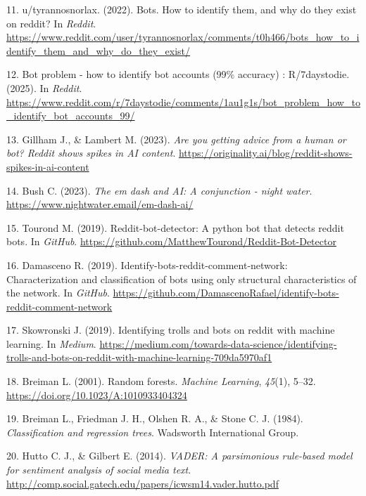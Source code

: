 \documentclass[
  12pt,
  letterpaper,
  DIV=11,
  numbers=noendperiod]{scrartcl}
\newlength{\cslhangindent}
\newenvironment{CSLReferences}[2] %
 {\begin{list}{}{%
  \setlength{\itemindent}{0pt}
  \setlength{\leftmargin}{0pt}
  \setlength{\parsep}{0pt}
  \ifodd #1
   \setlength{\leftmargin}{\cslhangindent}
   \setlength{\itemindent}{-1\cslhangindent}
  \fi
  \setlength{\itemsep}{#2\baselineskip}}}
 {\end{list}}
\begin{document}
\begin{CSLReferences}{1}{0}
11. u/tyrannosnorlax. (2022). Bots. How to identify them, and why do
they exist on reddit? In \emph{Reddit}.
\url{https://www.reddit.com/user/tyrannosnorlax/comments/t0h466/bots_how_to_identify_them_and_why_do_they_exist/}

12. Bot problem - how to identify bot accounts (99\% accuracy) :
R/7daystodie. (2025). In \emph{Reddit}.
\url{https://www.reddit.com/r/7daystodie/comments/1au1g1s/bot_problem_how_to_identify_bot_accounts_99/}

13. Gillham J., \& Lambert M. (2023). \emph{Are you getting advice from
a human or bot? Reddit shows spikes in AI content}.
\url{https://originality.ai/blog/reddit-shows-spikes-in-ai-content}

14. Bush C. (2023). \emph{The em dash and AI: A conjunction - night
water}. \url{https://www.nightwater.email/em-dash-ai/}

15. Tourond M. (2019). Reddit-bot-detector: A python bot that detects
reddit bots. In \emph{GitHub}.
\url{https://github.com/MatthewTourond/Reddit-Bot-Detector}

16. Damasceno R. (2019). Identify-bots-reddit-comment-network:
Characterization and classification of bots using only structural
characteristics of the network. In \emph{GitHub}.
\url{https://github.com/DamascenoRafael/identify-bots-reddit-comment-network}

17. Skowronski J. (2019). Identifying trolls and bots on reddit with
machine learning. In \emph{Medium}.
\url{https://medium.com/towards-data-science/identifying-trolls-and-bots-on-reddit-with-machine-learning-709da5970af1}

18. Breiman L. (2001). Random forests. \emph{Machine Learning},
\emph{45}(1), 5--32. \url{https://doi.org/10.1023/A:1010933404324}

19. Breiman L., Friedman J. H., Olshen R. A., \& Stone C. J. (1984).
\emph{Classification and regression trees}. Wadsworth International
Group.

20. Hutto C. J., \& Gilbert E. (2014). \emph{VADER: A parsimonious
rule-based model for sentiment analysis of social media text}.
\url{http://comp.social.gatech.edu/papers/icwsm14.vader.hutto.pdf}


\end{CSLReferences}
\end{document}
